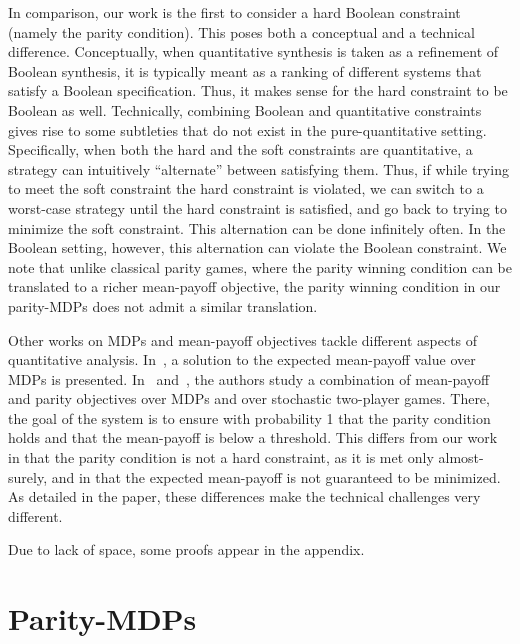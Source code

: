 \documentclass[runningheads,a4paper]{llncs}
\newcommand{\zug}[1]{\langle #1  \rangle}
\newcommand{\stam}[1]{}
\newcommand{\M}{{\cal M}}
\begin{document}
In comparison, our work is the first to consider a hard Boolean constraint (namely the parity condition). This poses both a conceptual and a technical difference. Conceptually, when quantitative synthesis is taken as a refinement of Boolean synthesis, it is typically meant as a ranking of different systems that satisfy a Boolean specification. Thus, it makes sense for the hard constraint to be Boolean as well. 
Technically, combining Boolean and quantitative constraints gives rise to some subtleties that do not exist in the pure-quantitative setting. Specifically, when both the hard and the soft constraints are quantitative, a strategy can intuitively ``alternate'' between satisfying them. Thus, if while trying to meet the soft constraint the hard constraint is violated, we can switch to a worst-case strategy until the hard constraint is satisfied, and go back to trying to minimize the soft constraint. This alternation can be done infinitely often. In the Boolean setting, however, this alternation can violate the Boolean constraint. We note that 
unlike classical parity games, where the parity winning condition can be translated to a richer mean-payoff objective,
the parity winning condition in our parity-MDPs does not admit a similar translation.


Other works on MDPs and mean-payoff objectives tackle different aspects of quantitative analysis. In~\cite{Put14}, a solution to the expected mean-payoff value over MDPs is presented. In~\cite{CD11} and~\cite{CLGO14}, the authors study a combination of mean-payoff and parity objectives over MDPs and over stochastic two-player games. There, the goal of the system is to ensure with probability 1 that the parity condition holds and that the mean-payoff is below a threshold. This differs from our work in that the parity condition is not a hard constraint, as it is met only almost-surely, and in that the 
expected mean-payoff is not guaranteed to be
minimized. As detailed in the paper, these differences make the technical challenges very different.

Due to lack of space, some proofs appear in the appendix.
\section{Parity-MDPs}
\label{sec:prelim}

\stam{
A Markov chain $\M=\zug{S,P}$ consists of a finite state space $S$ and a 
  stochastic transition matrix $P:S \times S \rightarrow [0,1]$. That is, for all $s \in S$, we have $\sum_{s' \in S} P(s,s') =1$. Given an initial state $s_0$, consider the vector $v^0$ in which $v^0(s_0)=1$ and $v^0(s)=0$ for every $s\neq s_0$. The {\em limiting distribution} of $\M$ is $\lim_{n\to \infty}\frac{1}{n}\sum_{m=0}^n v^0P^m$. The limiting distribution satisfies $\pi P=\pi$, and can be computed in polynomial time~\cite{GL97}.
}
\end{document}
